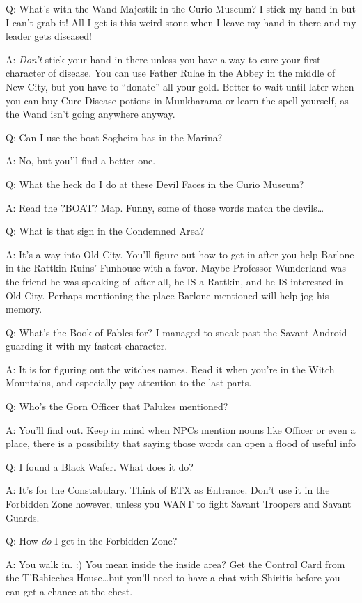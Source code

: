 \documentclass[12pt]{article}
\begin{document}
Q: What's with the Wand Majestik in the Curio Museum? I stick my hand in
but I can't grab it! All I get is this weird stone when I leave my hand
in there and my leader gets diseased!

A: \emph{Don't} stick your hand in there unless you have a way to cure
your first character of disease. You can use Father Rulae in the Abbey
in the middle of New City, but you have to ``donate'' all your gold.
Better to wait until later when you can buy Cure Disease potions in
Munkharama or learn the spell yourself, as the Wand isn't going anywhere
anyway.

Q: Can I use the boat Sogheim has in the Marina?

A: No, but you'll find a better one.

Q: What the heck do I do at these Devil Faces in the Curio Museum?

A: Read the ?BOAT? Map. Funny, some of those words match the
devils\ldots{}

Q: What is that sign in the Condemned Area?

A: It's a way into Old City. You'll figure out how to get in after you
help Barlone in the Rattkin Ruins' Funhouse with a favor. Maybe
Professor Wunderland was the friend he was speaking of--after all, he IS
a Rattkin, and he IS interested in Old City. Perhaps mentioning the
place Barlone mentioned will help jog his memory.

Q: What's the Book of Fables for? I managed to sneak past the Savant
Android guarding it with my fastest character.

A: It is for figuring out the witches names. Read it when you're in the
Witch Mountains, and especially pay attention to the last parts.

Q: Who's the Gorn Officer that Palukes mentioned?

A: You'll find out. Keep in mind when NPCs mention nouns like Officer or
even a place, there is a possibility that saying those words can open a
flood of useful info

Q: I found a Black Wafer. What does it do?

A: It's for the Constabulary. Think of ETX as Entrance. Don't use it in
the Forbidden Zone however, unless you WANT to fight Savant Troopers and
Savant Guards.

Q: How \emph{do} I get in the Forbidden Zone?

A: You walk in. :) You mean inside the inside area? Get the Control Card
from the T'Rshieches House\ldots{}but you'll need to have a chat with
Shiritis before you can get a chance at the chest.
\end{document}
